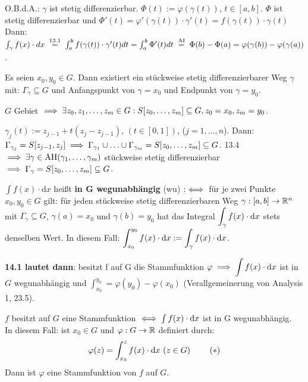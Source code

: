 \documentclass[a4paper,oneside,DIV15,BCOR12mm,chapterprefix=true,headings=onelinechapter]{scrbook}
\begin{document}
\begin{beweis}
O.B.d.A.: $\gamma$ ist stetig differenzierbar. $\Phi(t):= \varphi (\gamma(t))$, $t\in[a,b]$. $\Phi$ ist stetig differenzierbar und $\Phi'(t) = \varphi'(\gamma(t))\cdot \gamma'(t) = f(\gamma(t))\cdot\gamma(t)$ Dann: $\int_\gamma f(x)\cdot dx \gleichnach{13.1} \int_a^bf(\gamma(t))\cdot\gamma'(t)dt = \int_a^b\Phi'(t)dt \gleichnach{AI} \Phi(b)-\Phi(a) = \varphi(\gamma(b))-\varphi(\gamma(a))$.
\end{beweis}

\begin{wichtigerhilfssatz}
Es seien $x_0,y_0\in G$. Dann existiert ein stückweise stetig differenzierbarer Weg $\gamma$ mit: $\Gamma_\gamma\subseteq G$ und Anfangspunkt von $\gamma = x_0$ und Endpunkt von $\gamma=y_0$.
\end{wichtigerhilfssatz}

\begin{beweis}
$G$ Gebiet $\implies \exists z_0,z_1,\ldots,z_m \in G: S[z_0,\ldots,z_m]\subseteq G, z_0=x_0, z_m = y_0$.

$\gamma_j(t) := z_{j-1} + t(z_j - z_{j-1})$, $(t\in[0,1])$, ($j=1,\ldots,n$). Dann:$\Gamma_{\gamma_j} = S[z_{j-1},z_{j}] \implies \Gamma_{\gamma_1}\cup\ldots\cup\Gamma_{\gamma_m} = S[z_0,\ldots,z_m] \subseteq G$. 13.4 $\implies \exists \gamma \in \text{AH}(\gamma_1,\ldots,\gamma_m)$ stückweise stetig differenzierbar $\implies \Gamma_{\gamma} = S[z_0,\ldots,z_m] \subseteq G$. 
\end{beweis}

\begin{definition*}
$\int f(x)\cdot \text{d}x$ heißt \textbf{in G wegunabhängig} (wu) $:\iff$ für je zwei Punkte $x_0, y_0\in G$ gilt: für jeden stückweise stetig differenzierbaren Weg $\gamma:[a,b]\to\mathbb{R}^n$ mit $\Gamma_\gamma\subseteq G$, $\gamma(a)=x_0$ und $\gamma(b)=y_0$ hat das Integral $\displaystyle\int_\gamma f(x)\cdot\text{d}x$ stets denselben Wert. In diesem Fall: $\displaystyle\int_{x_0}^{y_0}f(x)\cdot\text{d}x:=\displaystyle\int_\gamma f(x)\cdot\text{d}x$.
\end{definition*}

\textbf{14.1 lautet dann}: besitzt f auf G die Stammfunktion $\varphi\implies \displaystyle\int f(x)\cdot\text{d}x$ ist in $G$ wegunabhängig und $\int_{x_0}^{y_0}=\varphi(y_0)-\varphi(x_0)$ (Verallgemeinerung von Analysis 1, 23.5).

\begin{satz}
$f$ besitzt auf $G$ eine Stammfunktion $\iff\int f(x)\cdot\text{d}x$ ist in G wegunabhängig. \\
In diesem Fall: ist $x_0\in G$ und $\varphi:G\to\mathbb{R}$ definiert durch: 
\begin{align*}
\varphi(z)=\displaystyle\int_{x_0}^z f(x)\cdot\text{d}x\ (z\in G)\ \tag{$*$}
\end{align*}
Dann ist $\varphi$ eine Stammfunktion von $f$ auf $G$.
\end{satz}
\end{document}
